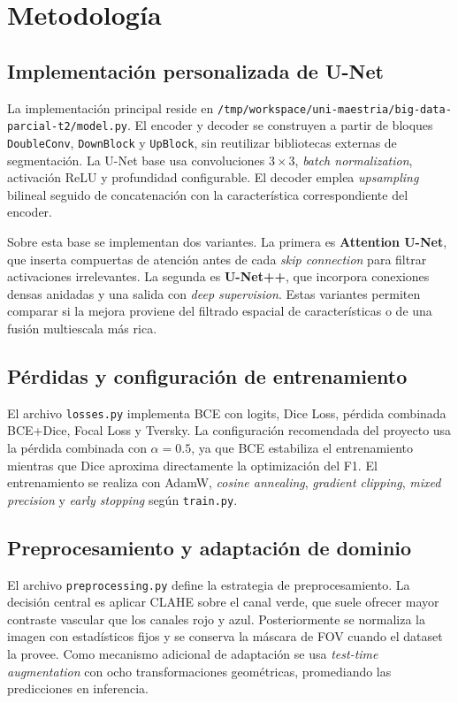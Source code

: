 \section{Metodología}
\subsection{Implementación personalizada de U-Net}
La implementación principal reside en \texttt{/tmp/workspace/uni-maestria/big-data-parcial-t2/model.py}. El encoder y decoder se construyen a partir de bloques \texttt{DoubleConv}, \texttt{DownBlock} y \texttt{UpBlock}, sin reutilizar bibliotecas externas de segmentación. La U-Net base usa convoluciones $3\times3$, \emph{batch normalization}, activación ReLU y profundidad configurable. El decoder emplea \emph{upsampling} bilineal seguido de concatenación con la característica correspondiente del encoder.

Sobre esta base se implementan dos variantes. La primera es \textbf{Attention U-Net}, que inserta compuertas de atención antes de cada \emph{skip connection} para filtrar activaciones irrelevantes. La segunda es \textbf{U-Net++}, que incorpora conexiones densas anidadas y una salida con \emph{deep supervision}. Estas variantes permiten comparar si la mejora proviene del filtrado espacial de características o de una fusión multiescala más rica.

\subsection{Pérdidas y configuración de entrenamiento}
El archivo \texttt{losses.py} implementa BCE con logits, Dice Loss, pérdida combinada BCE+Dice, Focal Loss y Tversky. La configuración recomendada del proyecto usa la pérdida combinada con $\alpha=0.5$, ya que BCE estabiliza el entrenamiento mientras que Dice aproxima directamente la optimización del F1. El entrenamiento se realiza con AdamW, \emph{cosine annealing}, \emph{gradient clipping}, \emph{mixed precision} y \emph{early stopping} según \texttt{train.py}.

\subsection{Preprocesamiento y adaptación de dominio}
El archivo \texttt{preprocessing.py} define la estrategia de preprocesamiento. La decisión central es aplicar CLAHE sobre el canal verde, que suele ofrecer mayor contraste vascular que los canales rojo y azul. Posteriormente se normaliza la imagen con estadísticos fijos y se conserva la máscara de FOV cuando el dataset la provee. Como mecanismo adicional de adaptación se usa \emph{test-time augmentation} con ocho transformaciones geométricas, promediando las predicciones en inferencia.

